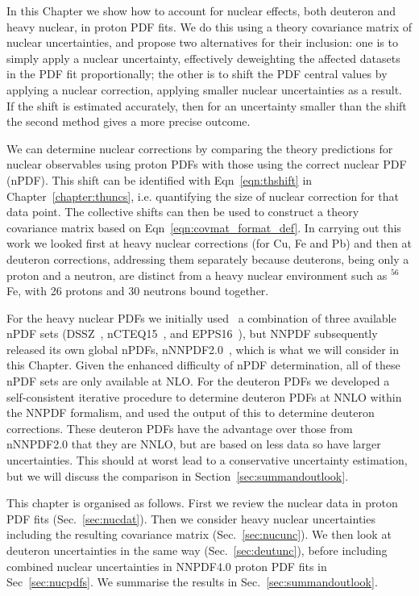 In this Chapter we show how to account for nuclear effects, both deuteron and heavy nuclear, in proton PDF fits. We do this using a theory covariance matrix of nuclear uncertainties, and propose two alternatives for their inclusion: one is to simply apply a nuclear uncertainty, effectively deweighting the affected datasets in the PDF fit proportionally; the other is to shift the PDF central values by applying a nuclear correction, applying smaller nuclear uncertainties as a result. If the shift is estimated accurately, then for an uncertainty smaller than the shift the second method gives a more precise outcome.

We can determine nuclear corrections by comparing the theory predictions for nuclear observables using proton PDFs with those using the correct nuclear PDF (nPDF). This shift can be identified with Eqn~\ref{eqn:thshift} in Chapter~\ref{chapter:thuncs}, i.e. quantifying the size of nuclear correction for that data point. The collective shifts can then be used to construct a theory covariance matrix based on Eqn~\ref{eqn:covmat_format_def}. In carrying out this work we looked first at heavy nuclear corrections (for Cu, Fe and Pb) and then at deuteron corrections, addressing them separately because deuterons, being only a proton and a neutron, are distinct from a heavy nuclear environment such as $^{56}$Fe, with 26 protons and 30 neutrons bound together. 

For the heavy nuclear PDFs we initially used~\cite{Ball:2018twp} a combination of three available nPDF sets (DSSZ~\cite{deFlorian:2011fp},
nCTEQ15~\cite{Kovarik:2015cma}, and EPPS16~\cite{Eskola:2016oht}), but NNPDF subsequently released its own global nPDFs, nNNPDF2.0~\cite{AbdulKhalek:2020yuc}, which is what we will consider in this Chapter. Given the enhanced difficulty of nPDF determination, all of these nPDF sets are only available at NLO. For the deuteron PDFs we developed a self-consistent iterative procedure to determine deuteron PDFs at NNLO within the NNPDF formalism, and used the output of this to determine deuteron corrections. These deuteron PDFs have the advantage over those from nNNPDF2.0 that they are NNLO, but are based on less data so have larger uncertainties. This should at worst lead to a conservative uncertainty estimation, but we will discuss the comparison in Section~\ref{sec:summandoutlook}.

This chapter is organised as follows. First we review the nuclear data in proton PDF fits (Sec.~\ref{sec:nucdat}). Then we consider heavy nuclear uncertainties including the resulting covariance matrix (Sec.~\ref{sec:nucunc}). We then look at deuteron uncertainties in the same way (Sec.~\ref{sec:deutunc}), before including combined nuclear uncertainties in NNPDF4.0 proton PDF fits in Sec~\ref{sec:nucpdfs}. We summarise the results in Sec.~\ref{sec:summandoutlook}.


